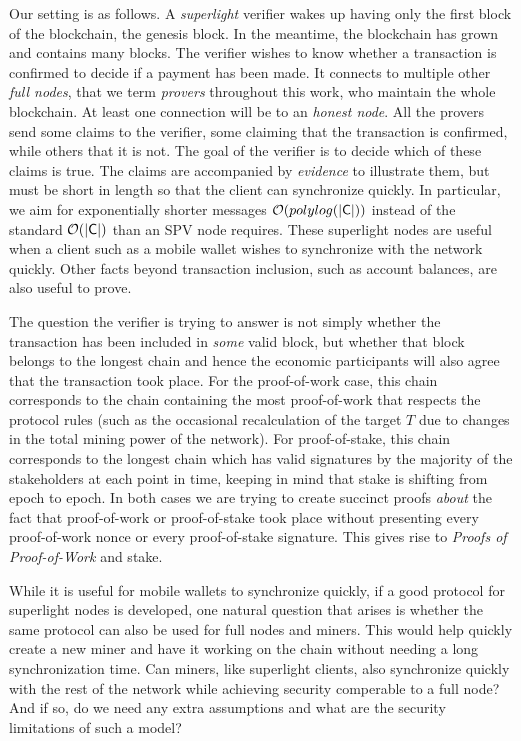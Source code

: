 Our setting is as follows. A \emph{superlight} verifier wakes up having only the
first block of the blockchain, the genesis block. In the meantime, the
blockchain has grown and contains many blocks. The verifier wishes to know
whether a transaction is confirmed to decide if a payment has been made. It
connects to multiple other \emph{full nodes}, that we term \emph{provers}
throughout this work, who maintain the whole blockchain. At least one connection
will be to an \emph{honest node}. All the provers send some claims to the
verifier, some claiming that the transaction is confirmed, while others that it
is not. The goal of the verifier is to decide which of these claims is true. The
claims are accompanied by \emph{evidence} to illustrate them, but must be short
in length so that the client can synchronize quickly. In particular, we aim for
exponentially shorter messages $\mathcal{O}(polylog(|\mathsf{C}|))$ instead of the
standard $\mathcal{O}(|\mathsf{C}|)$ than an SPV node requires. These superlight nodes are
useful when a client such as a mobile wallet wishes to synchronize with the
network quickly. Other facts beyond transaction inclusion, such as account
balances, are also useful to prove.

The question the verifier is trying to answer is not simply whether the
transaction has been included in \emph{some} valid block, but whether that block
belongs to the longest chain and hence the economic participants will also agree
that the transaction took place. For the proof-of-work case, this chain
corresponds to the chain containing the most proof-of-work that respects the
protocol rules (such as the occasional recalculation of the target $T$ due to
changes in the total mining power of the network). For proof-of-stake, this
chain corresponds to the longest chain which has valid signatures by the
majority of the stakeholders at each point in time, keeping in mind that stake
is shifting from epoch to epoch. In both cases we are trying to create succinct
proofs \emph{about} the fact that proof-of-work or proof-of-stake took place
without presenting every proof-of-work nonce or every proof-of-stake signature.
This gives rise to \emph{Proofs of Proof-of-Work} and stake.

While it is useful for mobile wallets to synchronize quickly, if a good protocol
for superlight nodes is developed, one natural question that arises is whether
the same protocol can also be used for full nodes and miners. This would help
quickly create a new miner and have it working on the chain without needing a
long synchronization time. Can miners, like superlight clients, also synchronize
quickly with the rest of the network while achieving security comperable to a
full node? And if so, do we need any extra assumptions and what are the security
limitations of such a model?

